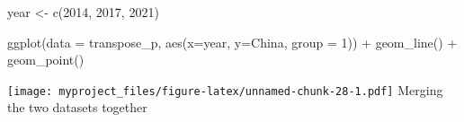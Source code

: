 \documentclass[
]{article}
\newenvironment{Shaded}{\begin{snugshade}}{\end{snugshade}}
\newcommand{\AttributeTok}[1]{\textcolor[rgb]{0.77,0.63,0.00}{#1}}
\newcommand{\DecValTok}[1]{\textcolor[rgb]{0.00,0.00,0.81}{#1}}
\newcommand{\FunctionTok}[1]{\textcolor[rgb]{0.00,0.00,0.00}{#1}}
\newcommand{\NormalTok}[1]{#1}
\newcommand{\OtherTok}[1]{\textcolor[rgb]{0.56,0.35,0.01}{#1}}
\newcommand{\SpecialCharTok}[1]{\textcolor[rgb]{0.00,0.00,0.00}{#1}}
\begin{document}
\begin{Shaded}
\begin{Highlighting}[]
\NormalTok{year }\OtherTok{\textless{}{-}} \FunctionTok{c}\NormalTok{(}\DecValTok{2014}\NormalTok{, }\DecValTok{2017}\NormalTok{, }\DecValTok{2021}\NormalTok{)}

\FunctionTok{ggplot}\NormalTok{(}\AttributeTok{data =}\NormalTok{ transpose\_p, }\FunctionTok{aes}\NormalTok{(}\AttributeTok{x=}\NormalTok{year, }\AttributeTok{y=}\NormalTok{China, }\AttributeTok{group =} \DecValTok{1}\NormalTok{)) }\SpecialCharTok{+}
  \FunctionTok{geom\_line}\NormalTok{() }\SpecialCharTok{+}
  \FunctionTok{geom\_point}\NormalTok{()}
\end{Highlighting}
\end{Shaded}

\texttt{[image: myproject\_files/figure-latex/unnamed-chunk-28-1.pdf]}
Merging the two datasets together
\end{document}
